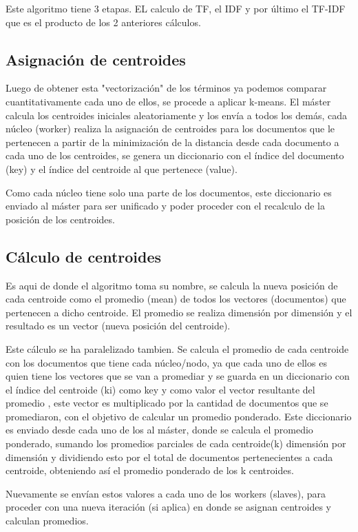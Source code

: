 Este algoritmo tiene 3 etapas. EL calculo de TF, el IDF y por último el TF-IDF que es el producto de los 2 anteriores cálculos.

\subsection{Asignación de centroides}
Luego de obtener esta "vectorización" de los términos ya podemos comparar
cuantitativamente cada uno de ellos, se procede a aplicar k-means.
El máster calcula los centroides iniciales aleatoriamente y los envía a todos los demás,
cada núcleo (worker) realiza la asignación de centroides para los documentos que le pertenecen
a partir de la minimización de la distancia desde cada documento a cada uno de
los centroides, se genera un diccionario con el índice del documento (key) y el
índice del centroide al que pertenece (value).

Como cada núcleo tiene solo una parte de los documentos, este diccionario es
enviado al máster para ser unificado y poder proceder con el recalculo de la
posición de los centroides.

\subsection{Cálculo de centroides}
Es aqui de donde el algoritmo toma su nombre, se calcula la nueva posición de cada
centroide como el promedio (mean) de todos los vectores (documentos) que pertenecen a
dicho centroide. El promedio se realiza dimensión por dimensión y el resultado
es un vector (nueva posición del centroide).

Este cálculo se ha paralelizado tambien. Se calcula el promedio de cada centroide
con los documentos que tiene cada núcleo/nodo, ya que cada uno de ellos es quien
tiene los vectores que se van a promediar y se guarda en un diccionario con el
índice del centroide (ki) como key y como valor el vector resultante del promedio
, este vector es multiplicado por la cantidad de documentos que se promediaron,
con el objetivo de calcular un promedio ponderado.
Este diccionario es enviado desde cada uno de los al máster, donde se calcula el
promedio ponderado, sumando los promedios parciales de cada centroide(k)
dimensión por dimensión y dividiendo esto por el total de documentos pertenecientes
a cada centroide, obteniendo así el promedio ponderado de los k centroides.

Nuevamente se envían estos valores a cada uno de los workers (slaves), para
proceder con una nueva iteración (si aplica) en donde se asignan centroides y
calculan promedios.

